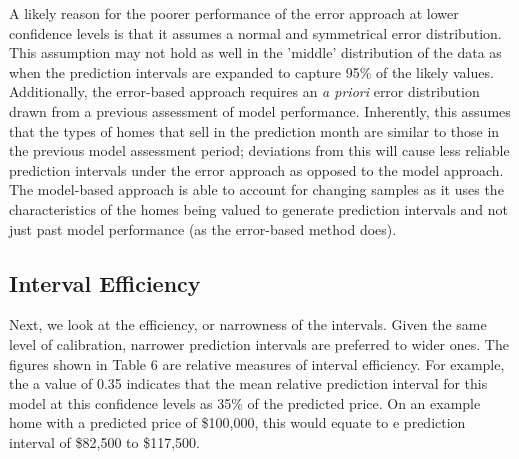 \documentclass[colTwo]{anon}
\theoremstyle{definition}
\begin{document}
A likely reason for the poorer performance of the error approach at lower confidence levels is that it assumes a normal and symmetrical error distribution. This assumption may not hold as well in the 'middle' distribution of the data as when the prediction intervals are expanded to capture 95\% of the likely values. Additionally, the error-based approach requires an \textit{a priori} error distribution drawn from a previous assessment of model performance.  Inherently, this assumes that the types of homes that sell in the prediction month are similar to those in the previous model assessment period; deviations from this will cause less reliable prediction intervals under the error approach as opposed to the model approach.  The model-based approach is able to account for changing samples as it uses the characteristics of the homes being valued to generate prediction intervals and not just past model performance (as the error-based method does). 

\subsection{Interval Efficiency}

Next, we look at the efficiency, or narrowness of the intervals.  Given the same level of calibration, narrower prediction intervals are preferred to wider ones. The figures shown in Table 6 are relative measures of interval efficiency.  For example, the a value of 0.35 indicates that the mean relative prediction interval for this model at this confidence levels as 35\% of the predicted price. On an example home with a predicted price of \$100,000, this would equate to e prediction interval of \$82,500 to \$117,500.
\end{document}
